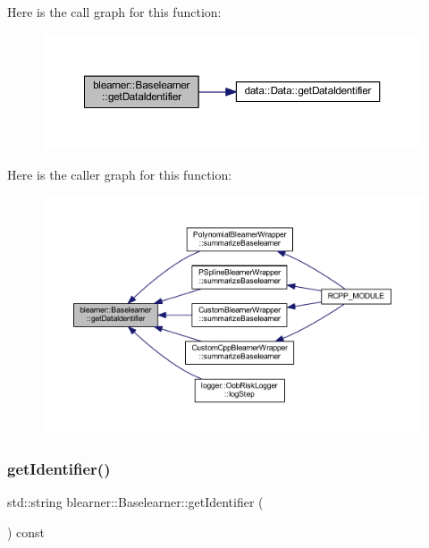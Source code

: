 Here is the call graph for this function\+:
\nopagebreak
\begin{figure}[H]
\begin{center}
\leavevmode
\includegraphics[width=350pt]{classblearner_1_1_baselearner_a2393dc1e3cf90919ebbbd237fe303860_cgraph}
\end{center}
\end{figure}
Here is the caller graph for this function\+:
\nopagebreak
\begin{figure}[H]
\begin{center}
\leavevmode
\includegraphics[width=350pt]{classblearner_1_1_baselearner_a2393dc1e3cf90919ebbbd237fe303860_icgraph}
\end{center}
\end{figure}
\mbox{\label{classblearner_1_1_baselearner_aa10fa4301aeb37f6e8c18457541c3be7}} 
\subsubsection{\texorpdfstring{get\+Identifier()}{getIdentifier()}}
{\footnotesize\ttfamily std\+::string blearner\+::\+Baselearner\+::get\+Identifier (\begin{DoxyParamCaption}{ }\end{DoxyParamCaption}) const}

